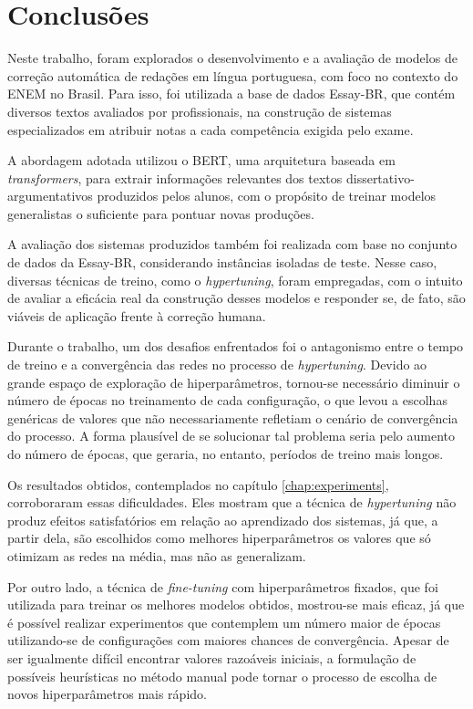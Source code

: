 \chapter{Conclusões}

Neste trabalho, foram explorados o desenvolvimento e a avaliação de modelos de correção automática de redações em língua portuguesa, com foco no contexto do ENEM no Brasil. Para isso, foi utilizada a base de dados Essay-BR, que contém diversos textos avaliados por profissionais, na construção de sistemas especializados em atribuir notas a cada competência exigida pelo exame.

A abordagem adotada utilizou o BERT, uma arquitetura baseada em \textit{transformers}, para extrair informações relevantes dos textos dissertativo-argumentativos produzidos pelos alunos, com o propósito de treinar modelos generalistas o suficiente para pontuar novas produções.

A avaliação dos sistemas produzidos também foi realizada com base no conjunto de dados da Essay-BR, considerando instâncias isoladas de teste. Nesse caso, diversas técnicas de treino, como o \textit{hypertuning}, foram empregadas, com o intuito de avaliar a eficácia real da construção desses modelos e responder se, de fato, são viáveis de aplicação frente à correção humana.

Durante o trabalho, um dos desafios enfrentados foi o antagonismo entre o tempo de treino e a convergência das redes no processo de \textit{hypertuning}. Devido ao grande espaço de exploração de hiperparâmetros, tornou-se necessário diminuir o número de épocas no treinamento de cada configuração, o que levou a escolhas genéricas de valores que não necessariamente refletiam o cenário de convergência do processo. A forma plausível de se solucionar tal problema seria pelo aumento do número de épocas, que geraria, no entanto, períodos de treino mais longos.

Os resultados obtidos, contemplados no capítulo \ref{chap:experiments}, corroboraram essas dificuldades. Eles mostram que a técnica de \textit{hypertuning} não produz efeitos satisfatórios em relação ao aprendizado dos sistemas, já que, a partir dela, são escolhidos como melhores hiperparâmetros os valores que só otimizam as redes na média, mas não as generalizam.

Por outro lado, a técnica de \textit{fine-tuning} com hiperparâmetros fixados, que foi utilizada para treinar os melhores modelos obtidos, mostrou-se mais eficaz, já que é possível realizar experimentos que contemplem um número maior de épocas utilizando-se de configurações com maiores chances de convergência. Apesar de ser igualmente difícil encontrar valores razoáveis iniciais, a formulação de possíveis heurísticas no método manual pode tornar o processo de escolha de novos hiperparâmetros mais rápido.

